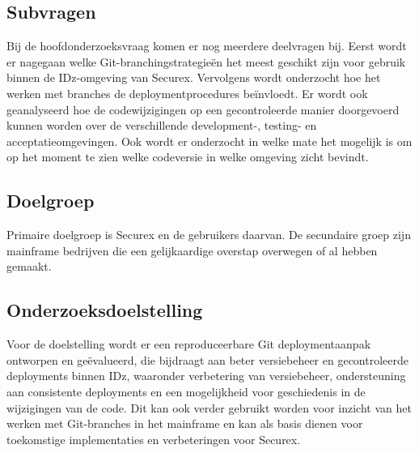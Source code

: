 \subsection{Subvragen}
Bij de hoofdonderzoeksvraag komen er nog meerdere deelvragen bij. Eerst wordt er nagegaan welke Git-branchingstrategieën het meest geschikt zijn voor gebruik binnen de IDz-omgeving van Securex. Vervolgens wordt onderzocht hoe het werken met branches de deploymentprocedures beïnvloedt. Er wordt ook geanalyseerd hoe de codewijzigingen op een gecontroleerde manier doorgevoerd kunnen worden over de verschillende development-, testing- en acceptatieomgevingen. Ook wordt er onderzocht in welke mate het mogelijk is om op het moment te zien welke codeversie in welke omgeving zicht bevindt.


\subsection{Doelgroep}
Primaire doelgroep is Securex en de gebruikers daarvan. De secundaire groep zijn mainframe bedrijven die een gelijkaardige overstap overwegen of al hebben gemaakt.

\subsection{Onderzoeksdoelstelling}
Voor de doelstelling wordt er een reproduceerbare Git deploymentaanpak ontworpen en geëvalueerd, die bijdraagt aan beter versiebeheer en gecontroleerde deployments binnen IDz, waaronder verbetering van versiebeheer, ondersteuning aan consistente deployments en een mogelijkheid voor geschiedenis in de wijzigingen van de code. Dit kan ook verder gebruikt worden voor inzicht van het werken met Git-branches in het mainframe en kan als basis dienen voor toekomstige implementaties en verbeteringen voor Securex.


